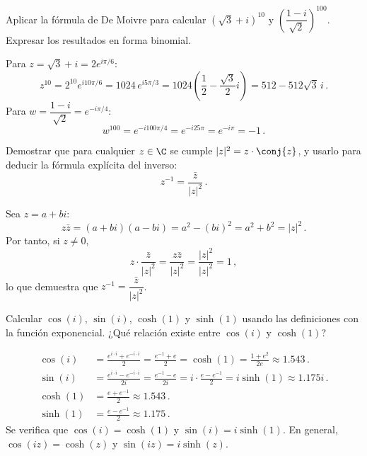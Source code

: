 \begin{questions}
  \question Aplicar la fórmula de De Moivre para calcular $(\sqrt{3}+i)^{10}$ y $\left(\dfrac{1-i}{\sqrt{2}}\right)^{100}$. Expresar los resultados en forma binomial.

  \begin{solution}
    Para $z=\sqrt{3}+i = 2e^{i\pi/6}$:
    \[
      z^{10} = 2^{10}e^{i10\pi/6} = 1024\,e^{i5\pi/3} = 1024\!\left(\frac{1}{2} - \frac{\sqrt{3}}{2}i\right) = 512 - 512\sqrt{3}\,i\,.
    \]
    Para $w=\dfrac{1-i}{\sqrt{2}} = e^{-i\pi/4}$:
    \[
      w^{100} = e^{-i100\pi/4} = e^{-i25\pi} = e^{-i\pi} = -1\,.
    \]
  \end{solution}


  \question Demostrar que para cualquier $z \in \C$ se cumple $|z|^2 = z \cdot \conj{z}$, y usarlo para deducir la fórmula explícita del inverso:
  \[
    z^{-1} = \frac{\bar{z}}{|z|^2}\,.
  \]

  \begin{solution}
    Sea $z = a + bi$:
    \[
      z\bar{z} = (a+bi)(a-bi) = a^2 - (bi)^2 = a^2 + b^2 = |z|^2\,.
    \]
    Por tanto, si $z\neq 0$,
    \[
      z\cdot\frac{\bar{z}}{|z|^2} = \frac{z\bar{z}}{|z|^2} = \frac{|z|^2}{|z|^2} = 1\,,
    \]
    lo que demuestra que $z^{-1} = \dfrac{\bar{z}}{|z|^2}$.
  \end{solution}

  \question Calcular $\cos(i)$, $\sin(i)$, $\cosh(1)$ y $\sinh(1)$ usando las definiciones con la función exponencial. ¿Qué relación existe entre $\cos(i)$ y $\cosh(1)$?

  \begin{solution}
    \begin{align*}
      \cos(i)  & = \frac{e^{i\cdot i}+e^{-i\cdot i}}{2} = \frac{e^{-1}+e}{2} = \cosh(1) = \frac{1+e^2}{2e}\approx 1.543\,.             \\
      \sin(i)  & = \frac{e^{i\cdot i}-e^{-i\cdot i}}{2i} = \frac{e^{-1}-e}{2i} = i\cdot\frac{e-e^{-1}}{2} = i\sinh(1)\approx 1.175i\,. \\
      \cosh(1) & = \frac{e+e^{-1}}{2}\approx 1.543\,.                                                                                  \\
      \sinh(1) & = \frac{e-e^{-1}}{2}\approx 1.175\,.
    \end{align*}
    Se verifica que $\cos(i) = \cosh(1)$ y $\sin(i) = i\sinh(1)$. En general, $\cos(iz) = \cosh(z)$ y $\sin(iz) = i\sinh(z)$.
  \end{solution}


\end{questions}
